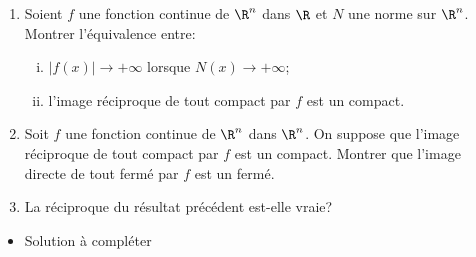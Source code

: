 \begin{enonce}
\begin{exercise}[ID={RMS134 E672},subtitle={Mines-Ponts MP 2023},tags={analyse, mines-ponts, 2023},difficulty={}]
  \begin{enumerate}[\bfseries a)]
  \item Soient $f$ une fonction continue de $\R^n$ dans $\R$ et $N$
    une norme sur $\R^n$. Montrer l'équivalence entre:
    \begin{enumerate}[(i)]
    \item $|f(x)|\to +\infty$ lorsque $N(x)\to +\infty$;
    \item l'image réciproque de tout compact par $f$ est un compact.
    \end{enumerate}
  \item Soit $f$ une fonction continue de $\R^n$ dans $\R^n$. On
    suppose que l'image réciproque de tout compact par $f$ est un
    compact. Montrer que l'image directe de tout fermé par $f$ est un
    fermé.
  \item La réciproque du résultat précédent est-elle vraie?
  \end{enumerate}
\end{exercise}
\begin{solution}
  \begin{itemize}
    \item Solution à compléter
  \end{itemize}
\end{solution}
\end{enonce}